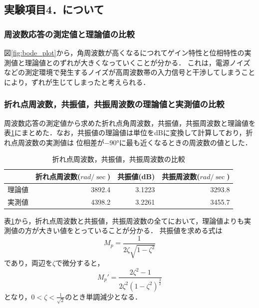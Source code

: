 \documentclass{jlreq}
\numberwithin{equation}{section}
\begin{document}
\subsection{実験項目4．について}
\subsubsection{周波数応答の測定値と理論値の比較}
図\ref{fig:bode_plot}から，角周波数が高くなるにつれてゲイン特性と位相特性の実測値と理論値とのずれが大きくなっていくことが分かる．
これは，電源ノイズなどの測定環境で発生するノイズが高周波数帯の入力信号と干渉してしまうことにより，ずれが生じてしまったと考えられる．

\subsubsection{折れ点周波数，共振値，共振周波数の理論値と実測値の比較}
周波数応答の測定値から求めた折れ点角周波数，共振値，共振周波数と理論値を表\ref{fig:phase_react_comp}にまとめた．なお，共振値の理論値は単位をdBに変換して計算しており，折れ点周波数の実測値は
位相差が$-90\si{\degree}$に最も近くなるときの周波数の値とした．
\begin{table}[H]
  \centering
  \caption{折れ点周波数，共振値，共振周波数の比較}
  \begin{tabular}{|r|r|r|r|}
    \hline
    ~      & 折れ点周波数($\si{rad\per\sec}$) & 共振値(dB) & 共振周波数($\si{rad\per\sec}$) \\
    \hline
    理論値 & 3892.4                           & 3.1223     & 3293.8                         \\
    \hline
    実測値 & 4398.2                           & 3.2261     & 3455.7                         \\
    \hline
  \end{tabular}
  \label{fig:phase_react_comp}
\end{table}

表\ref{fig:phase_react_comp}から，折れ点周波数と共振値，共振周波数の全てにおいて，理論値よりも実測値の方が大きい値をとっていることが分かる．
共振値を求める式は
\begin{equation}
  M_p = \frac{1}{2\zeta\sqrt{1-\zeta^2}}
\end{equation}
であり，両辺を$\zeta$で微分すると，
\begin{equation}
  M_p' = \frac{2\zeta^2-1}{2\zeta^2(1-\zeta^2)^{\frac{3}{2}}}
\end{equation}
となり，$0 < \zeta < \frac{1}{\sqrt{2}}$のとき単調減少となる．
\end{document}
